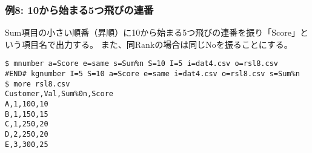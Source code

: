 \subsubsection*{例8: 10から始まる5つ飛びの連番}

Sum項目の小さい順番（昇順）に10から始まる5つ飛びの連番を振り「Score」という項目名で出力する。
また、同Rankの場合は同じNoを振ることにする。


\begin{Verbatim}[baselinestretch=0.7,frame=single]
$ mnumber a=Score e=same s=Sum%n S=10 I=5 i=dat4.csv o=rsl8.csv
#END# kgnumber I=5 S=10 a=Score e=same i=dat4.csv o=rsl8.csv s=Sum%n
$ more rsl8.csv
Customer,Val,Sum%0n,Score
A,1,100,10
B,1,150,15
C,1,250,20
D,2,250,20
E,3,300,25
\end{Verbatim}
